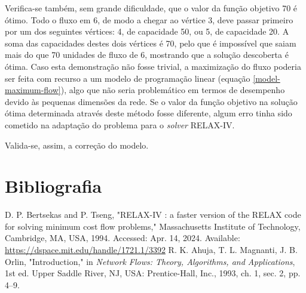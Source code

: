 \documentclass[12pt, a4paper, titlepage]{article}
\begin{document}
Verifica-se também, sem grande dificuldade, que o valor da função objetivo 70 é ótimo. Todo o fluxo
em 6, de modo a chegar ao vértice 3, deve passar primeiro por um dos seguintes vértices: 4, de
capacidade 50, ou 5, de capacidade 20. A soma das capacidades destes dois vértices é 70, pelo que é
impossível que saiam mais do que 70 unidades de fluxo de 6, mostrando que a solução descoberta é
ótima. Caso esta demonstração não fosse trivial, a maximização do fluxo poderia ser feita com
recurso a um modelo de programação linear (equação \ref{model-maximum-flow}), algo que não seria
problemático em termos de desempenho devido às pequenas dimensões da rede. Se o valor da função
objetivo na solução ótima determinada através deste método fosse diferente, algum erro tinha sido
cometido na adaptação do problema para o \emph{solver} RELAX-IV.

Valida-se, assim, a correção do modelo.

\section{Bibliografia}
\def\refname{}
\vspace{-1.5cm}
\begin{thebibliography}{9}
        D. P. Bertsekas and P. Tseng, "RELAX-IV : a faster version of the RELAX code for solving
        minimum cost flow problems,"{} Massachusetts Institute of Technology, Cambridge, MA, USA,
        1994. Accessed: Apr. 14, 2024. Available: \url{https://dspace.mit.edu/handle/1721.1/3392}
        R. K. Ahuja, T. L. Magnanti, J. B. Orlin, "Introduction,"{} in \emph{Network Flows: Theory,
        Algorithms, and Applications}, 1st ed. Upper Saddle River, NJ, USA: Prentice-Hall, Inc.,
        1993, ch. 1, sec. 2, pp. 4--9.
\end{thebibliography}
\end{document}
